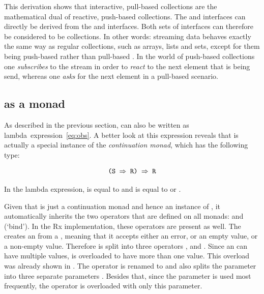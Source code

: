 
This derivation shows that interactive, pull-based collections are the mathematical dual of reactive, push-based collections. The \obs and \obv interfaces can directly be derived from the \ieb and \ier interfaces. Both sets of interfaces can therefore be considered to be collections. In other words: streaming data behaves exactly the same way as regular collections, such as arrays, lists and sets, except for them being push-based rather than pull-based \cite{meijer2012-YMIAD, meijer2010-Observable}. In the world of push-based collections one \emph{subscribes} to the stream in order to \emph{react} to the next element that is being send, whereas one \emph{asks} for the next element in a pull-based scenario.

\subsection{\obs as a monad}
\label{subsec:obs-monad}
As described in the previous section, \obs can also be written as lambda~expression~\ref{eq:obs}. A better look at this expression reveals that \obs is actually a special instance of the \textit{continuation monad}, which has the following type:

\begin{equation} \label{eq:cont}
\code{(S $\Rightarrow$ R) $\Rightarrow$ R}
\end{equation}

In the \obs lambda expression,  is equal to  and  is equal to \code{()} or .

Given that \obs is just a continuation monad and hence an instance of , it automatically inherits the two operators that are defined on all monads:  and \code{(>>=)} (`bind'). In the Rx implementation, these operators are present as well. The  creates an \obs from a , meaning that it accepts either an error, or an empty value, or a non-empty value. Therefore  is split into three operators ,  and . Since an \obs can have multiple values,  is overloaded to have more than one value. This overload was already shown in . The \code{(>>=)} operator is renamed to  and also splits the  parameter into three separate parameters \cite{rx-api}. Besides that, since the  parameter is used most frequently, the  operator is overloaded with only this parameter.

